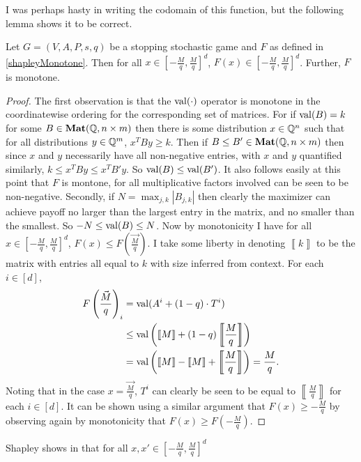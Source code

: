I was perhaps hasty in writing the codomain of this function, but the following lemma
shows it to be correct.
\begin{lemma}
  Let $G = (V, A, P, s, q)$ be a stopping stochastic game and $F$ as defined in \cref{shapleyMonotone}.
  Then for all $x \in [-\frac{M}{q}, \frac{M}{q}]^d$, $F(x) \in [-\frac{M}{q}, \frac{M}{q}]^d$.
  Further, $F$ is monotone.
\end{lemma}
\newcommand{\mat}[1]{\left\llbracket #1 \right\rrbracket}
\begin{proof}
  The first observation is that the $\mathrm{val}(\cdot)$ operator is monotone in the coordinatewise ordering
  for the corresponding set of matrices. For
  if $\mathrm{val}(B) = k$ for some $B \in \mathbf{Mat}(\mathbb{Q}, n \times m)$ then there is some
  distribution $x \in \mathbb{Q}^n$ such that for all distributions $y \in \mathbb{Q}^m$, $x^T B y \geq k$.
  Then if $B \leq B' \in \mathbf{Mat}(\mathbb{Q}, n \times m)$ then since $x$ and $y$ necessarily have
  all non-negative entries, with $x$ and $y$ quantified similarly, $k \leq x^T B y \leq x^T B' y$. So $\mathrm{val}(B) \leq \mathrm{val}(B')$.
  It also follows easily at this point that $F$ is montone, for all multiplicative factors involved can be seen to be
  non-negative.
  Secondly, if $N = \max_{j, k} |B_{j, k}|$ then clearly the maximizer can achieve payoff
  no larger than the largest entry in the matrix, and no smaller than the smallest. So $-N \leq \mathrm{val}(B) \leq N$.
  Now by monotonicity I have for all $x \in [-\frac{M}{q}, \frac{M}{q}]^d$, $F(x) \leq F\left(\vec{\frac{M}{q}}\right)$.
  I take some liberty in denoting $\mat{k}$ to be the matrix
  with entries all equal to $k$ with size inferred from context. For each $i \in [d]$,
  \begin{align*}
    F\left(\vec{\frac{M}{q}}\right)_i &= \val(A^i + (1 - q) \cdot T^i) \\
                               &\leq \val\left(\mat{M} + (1 - q) \mat{\frac{M}{q}}\right) \\
                               &= \val\left(\mat{M} - \mat{M} + \mat{\frac{M}{q}}\right) = \frac{M}{q}.
  \end{align*}
  Noting that in the case $x = \vec{\frac{M}{q}}$, $T^i$ can clearly be seen to be equal to $\mat{\frac{M}{q}}$ for
  each $i \in [d]$.
  It can be shown using a similar argument that $F(x) \geq -\frac{M}{q}$ by observing again by monotonicity
  that $F(x) \geq F\left(-\frac{M}{q}\right)$.
\end{proof}
Shapley shows in \citep{shapley} that for all $x, x' \in [-\frac{M}{q}, \frac{M}{q}]^d$ 

